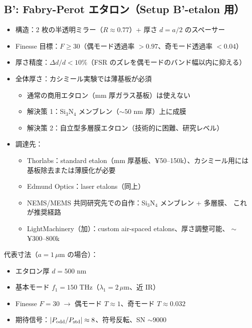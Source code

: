 \documentclass[11pt,a4paper]{article}
\def\textbf#1{#1}%
\begin{document}
\subsection{B': Fabry-Perot エタロン（Setup B'-etalon 用）}

\begin{itemize}
\item \textbf{構造}：2 枚の半透明ミラー（$R \approx 0.77$）+ 厚さ $d = a/2$ のスペーサー
\item \textbf{Finesse 目標}：$F \geq 30$（偶モード透過率 $> 0.97$、奇モード透過率 $< 0.04$）
\item \textbf{厚さ精度}：$\Delta d / d < 10\%$（FSR のズレを偶モードのバンド幅以内に抑える）
\item \textbf{全体厚さ}：カシミール実験では薄基板が必須
  \begin{itemize}
  \item 通常の商用エタロン（mm 厚ガラス基板）は使えない
  \item 解決策 1：Si$_3$N$_4$ メンブレン（$\sim 50$ nm 厚）上に成膜
  \item 解決策 2：自立型多層膜エタロン（技術的に困難、研究レベル）
  \end{itemize}
\item \textbf{調達先}：
  \begin{itemize}
  \item \textbf{Thorlabs}：standard etalon（mm 厚基板、¥50--150k）、カシミール用には
    基板除去または薄膜化が必要
  \item \textbf{Edmund Optics}：laser etalons（同上）
  \item \textbf{NEMS/MEMS 共同研究先での自作}：Si$_3$N$_4$ メンブレン + 多層膜、
    \textbf{これが推奨経路}
  \item \textbf{LightMachinery}（加）：custom air-spaced etalons、厚さ調整可能、
    $\sim$ ¥300--800k
  \end{itemize}
\end{itemize}

\textbf{代表寸法（$a = 1\,\mu$m の場合）}：
\begin{itemize}
\item エタロン厚 $d = 500$ nm
\item 基本モード $f_1 = 150$ THz（$\lambda_1 = 2\,\mu$m、近 IR）
\item Finesse $F = 30$ $\to$ 偶モード $T \approx 1$、奇モード $T \approx 0.032$
\item 期待信号：$|P_{\rm odd}/P_{\rm std}| \approx 8$、符号反転、SN $\sim 9000$
\end{itemize}
\end{document}
